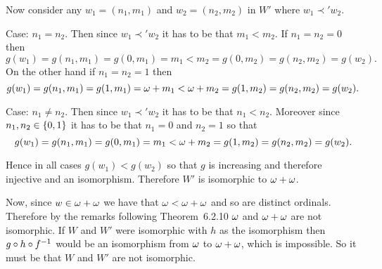 {{    Now consider any $w_1 = (n_1,m_1)$ and $w_2 = (n_2, m_2)$ in $W'$ where $w_1 \prec' w_2$.

    Case: $n_1 = n_2$.
    Then since $w_1 \prec' w_2$ it has to be that $m_1 < m_2$.
    If $n_1 = n_2 = 0$ then
    $$
      g(w_1) = g(n_1,m_1) = g(0,m_1) = m_1 < m_2 = g(0, m_2) = g(n_2,m_2) = g(w_2).
    $$
    On the other hand if $n_1 = n_2 = 1$ then
    $$
      g(w_1) = g(n_1,m_1) = g(1,m_1) = \omega + m_1 < \omega + m_2 = g(1, m_2) = g(n_2,m_2) = g(w_2).
    $$

    Case: $n_1 \neq n_2$.
    Then since $w_1 \prec' w_2$ it has to be that $n_1 < n_2$.
    Moreover since $n_1,n_2 \in \left\{ 0,1 \right\}$ it has to be that $n_1 = 0$ and $n_2 = 1$ so that
    $$
      g(w_1) = g(n_1,m_1) = g(0,m_1) = m_1 < \omega + m_2 = g(1,m_2) = g(n_2,m_2) = g(w_2).
    $$

    Hence in all cases $g(w_1) < g(w_2)$ so that $g$ is increasing and therefore injective and an isomorphism.
    Therefore $W'$ is isomorphic to $\omega + \omega$.

    Now, since $w \in \omega+\omega$ we have that $\omega < \omega+\omega$ and so are distinct ordinals.
    Therefore by the remarks following Theorem~6.2.10 $\omega$ and $\omega+\omega$ are not isomorphic.
    If $W$ and $W'$ were isomorphic with $h$ as the isomorphism then $g \circ h \circ f^{-1}$ would be an isomorphism from $\omega$ to $\omega + \omega$, which is impossible.
    So it must be that $W$ and $W'$ are not isomorphic.
  }
}

